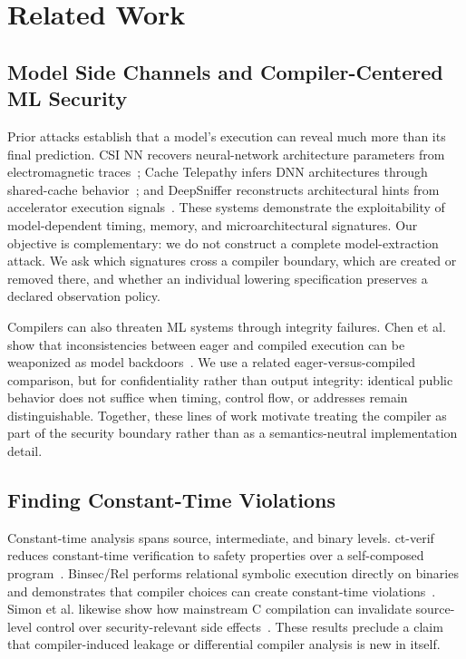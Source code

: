 \section{Related Work}
\label{sec:related-work}

\subsection{Model Side Channels and Compiler-Centered ML Security}

Prior attacks establish that a model's execution can reveal much more than its final prediction.
CSI NN recovers neural-network architecture parameters from electromagnetic traces~\cite{batina2019csinn}; Cache Telepathy infers DNN architectures through shared-cache behavior~\cite{yan2020cachetelepathy}; and DeepSniffer reconstructs architectural hints from accelerator execution signals~\cite{hu2020deepsniffer}.
These systems demonstrate the exploitability of model-dependent timing, memory, and microarchitectural signatures.
Our objective is complementary: we do not construct a complete model-extraction attack.
We ask which signatures cross a compiler boundary, which are created or removed there, and whether an individual lowering specification preserves a declared observation policy.

Compilers can also threaten ML systems through integrity failures.
Chen et al. show that inconsistencies between eager and compiled execution can be weaponized as model backdoors~\cite{chen2026compilerbackdoor}.
We use a related eager-versus-compiled comparison, but for confidentiality rather than output integrity: identical public behavior does not suffice when timing, control flow, or addresses remain distinguishable.
Together, these lines of work motivate treating the compiler as part of the security boundary rather than as a semantics-neutral implementation detail.

\subsection{Finding Constant-Time Violations}

Constant-time analysis spans source, intermediate, and binary levels. ct-verif reduces constant-time verification to safety properties over a self-composed program~\cite{almeida2016ctverif}.
Binsec/Rel performs relational symbolic execution directly on binaries and demonstrates that compiler choices can create constant-time violations~\cite{daniel2020binsecrel}.
Simon et al. likewise show how mainstream C compilation can invalidate source-level control over security-relevant side effects~\cite{simon2018whatyouc}.
These results preclude a claim that compiler-induced leakage or differential compiler analysis is new in itself.

